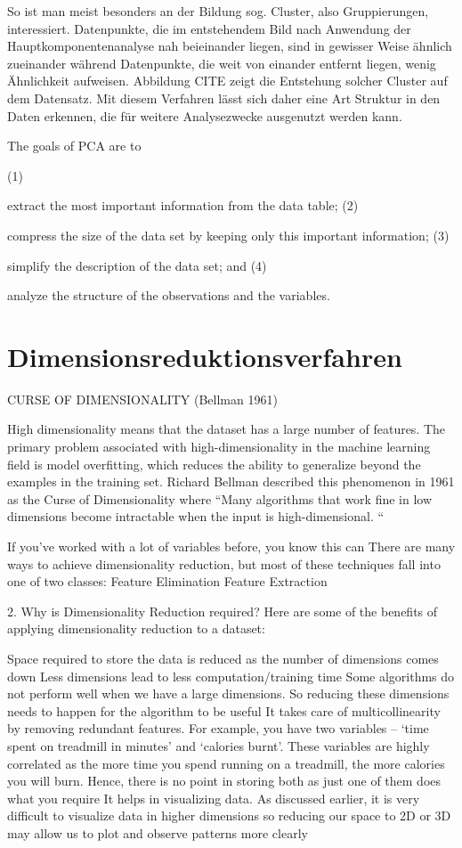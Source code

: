 So ist man meist besonders an der Bildung sog. Cluster, also Gruppierungen, interessiert. Datenpunkte, die im entstehendem Bild nach Anwendung der Hauptkomponentenanalyse nah beieinander liegen, sind in gewisser Weise ähnlich zueinander während Datenpunkte, die weit von einander entfernt liegen, wenig Ähnlichkeit aufweisen. Abbildung CITE zeigt die Entstehung solcher Cluster auf dem Datensatz. Mit diesem Verfahren lässt sich daher eine Art Struktur in den Daten erkennen, die für weitere Analysezwecke ausgenutzt werden kann.

The goals of PCA are to

    (1)

    extract the most important information from the data table;
    (2)

    compress the size of the data set by keeping only this important information;
    (3)

    simplify the description of the data set; and
    (4)

    analyze the structure of the observations and the variables.


\section{Dimensionsreduktionsverfahren}

CURSE OF DIMENSIONALITY (Bellman 1961)

High dimensionality means that the dataset has a large number of features. The primary problem associated with high-dimensionality in the machine learning field is model overfitting, which reduces the ability to generalize beyond the examples in the training set. Richard Bellman described this phenomenon in 1961 as the Curse of Dimensionality where “Many algorithms that work fine in low dimensions become intractable when the input is high-dimensional. “


If you’ve worked with a lot of variables before, you know this can  There are many ways to achieve dimensionality reduction, but most of these techniques fall into one of two classes:
Feature Elimination
Feature Extraction

2. Why is Dimensionality Reduction required?
Here are some of the benefits of applying dimensionality reduction to a dataset:

Space required to store the data is reduced as the number of dimensions comes down
Less dimensions lead to less computation/training time
Some algorithms do not perform well when we have a large dimensions. So reducing these dimensions needs to happen for the algorithm to be useful
It takes care of multicollinearity by removing redundant features. For example, you have two variables – ‘time spent on treadmill in minutes’ and ‘calories burnt’. These variables are highly correlated as the more time you spend running on a treadmill, the more calories you will burn. Hence, there is no point in storing both as just one of them does what you require
It helps in visualizing data. As discussed earlier, it is very difficult to visualize data in higher dimensions so reducing our space to 2D or 3D may allow us to plot and observe patterns more clearly

